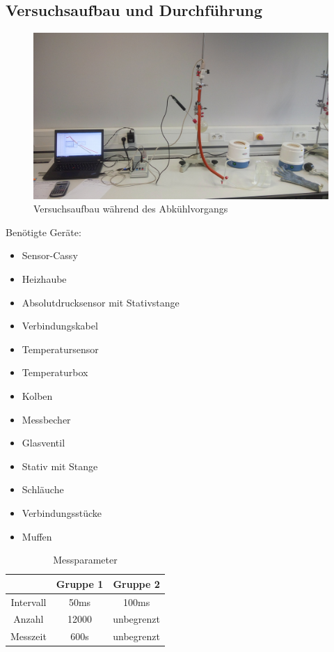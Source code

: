 \documentclass[12pt,a4paper]{article}
\begin{document}
\subsection{Versuchsaufbau und Durchführung}
\begin{figure}[H]
\centering
\includegraphics[scale=0.1]{Bilder/IMG_20160331_121650.jpg}
\caption{Versuchsaufbau während des Abkühlvorgangs}
\end{figure}
Benötigte Geräte:
\begin{multicols}{2}
\begin{itemize}
\item Sensor-Cassy
\item Heizhaube
\item Absolutdrucksensor mit Stativstange
\item Verbindungskabel
\item Temperatursensor
\item Temperaturbox
\columnbreak
\item Kolben
\item Messbecher
\item Glasventil
\item Stativ mit Stange
\item Schläuche
\item Verbindungsstücke
\item Muffen
\end{itemize}
\end{multicols}
\begin{table}[H]\centering \caption{Messparameter} \begin{tabular}{ccc} & Gruppe 1 & Gruppe 2 \\ \hline Intervall & 50ms & 100ms \\ Anzahl & 12000 & unbegrenzt \\ Messzeit & 600s & unbegrenzt \\ \end{tabular} \end{table}
\end{document}
